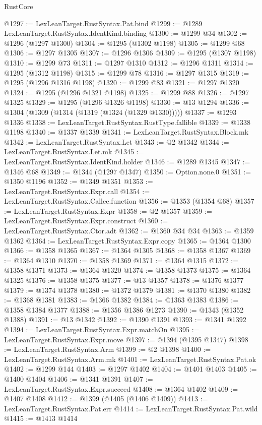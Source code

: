 \begin{lexlean}{RustCore}
\begin{coremodule}
@1297 := LexLeanTarget.RustSyntax.Pat.bind
@1299 := @1289 LexLeanTarget.RustSyntax.IdentKind.binding
@1300 := @1299 @34
@1302 := @1296 (@1297 @1300)
@1304 := @1295 (@1302 @1198)
@1305 := @1299 @68
@1306 := @1297 @1305
@1307 := @1296 @1306
@1309 := @1295 (@1307 @1198)
@1310 := @1299 @73
@1311 := @1297 @1310
@1312 := @1296 @1311
@1314 := @1295 (@1312 @1198)
@1315 := @1299 @78
@1316 := @1297 @1315
@1319 := @1295 (@1296 @1316 @1198)
@1320 := @1299 @83
@1321 := @1297 @1320
@1324 := @1295 (@1296 @1321 @1198)
@1325 := @1299 @88
@1326 := @1297 @1325
@1329 := @1295 (@1296 @1326 @1198)
@1330 := @13 @1294
@1336 := @1304 (@1309 (@1314 (@1319 (@1324 (@1329 @1330)))))
@1337 := @1293 @1336
@1338 := LexLeanTarget.RustSyntax.RustType.fallible
@1339 := @1338 @1198
@1340 := @1337 @1339
@1341 := LexLeanTarget.RustSyntax.Block.mk
@1342 := LexLeanTarget.RustSyntax.Let
@1343 := @2 @1342
@1344 := LexLeanTarget.RustSyntax.Let.mk
@1345 := LexLeanTarget.RustSyntax.IdentKind.holder
@1346 := @1289 @1345
@1347 := @1346 @68
@1349 := @1344 (@1297 @1347)
@1350 := Option.none.{0}
@1351 := @1350 @1196
@1352 := @1349 @1351
@1353 := LexLeanTarget.RustSyntax.Expr.call
@1354 := LexLeanTarget.RustSyntax.Callee.function
@1356 := @1353 (@1354 @68)
@1357 := LexLeanTarget.RustSyntax.Expr
@1358 := @2 @1357
@1359 := LexLeanTarget.RustSyntax.Expr.construct
@1360 := LexLeanTarget.RustSyntax.Ctor.adt
@1362 := @1360 @34 @34
@1363 := @1359 @1362
@1364 := LexLeanTarget.RustSyntax.Expr.copy
@1365 := @1364 @1300
@1366 := @1358 @1365
@1367 := @1364 @1305
@1368 := @1358 @1367
@1369 := @1364 @1310
@1370 := @1358 @1369
@1371 := @1364 @1315
@1372 := @1358 @1371
@1373 := @1364 @1320
@1374 := @1358 @1373
@1375 := @1364 @1325
@1376 := @1358 @1375
@1377 := @13 @1357
@1378 := @1376 @1377
@1379 := @1374 @1378
@1380 := @1372 @1379
@1381 := @1370 @1380
@1382 := @1368 @1381
@1383 := @1366 @1382
@1384 := @1363 @1383
@1386 := @1358 @1384 @1377
@1388 := @1356 @1386 @1273
@1390 := @1343 (@1352 @1388)
@1391 := @13 @1342
@1392 := @1390 @1391
@1393 := @1341 @1392
@1394 := LexLeanTarget.RustSyntax.Expr.matchOn
@1395 := LexLeanTarget.RustSyntax.Expr.move
@1397 := @1394 (@1395 @1347)
@1398 := LexLeanTarget.RustSyntax.Arm
@1399 := @2 @1398
@1400 := LexLeanTarget.RustSyntax.Arm.mk
@1401 := LexLeanTarget.RustSyntax.Pat.ok
@1402 := @1299 @144
@1403 := @1297 @1402
@1404 := @1401 @1403
@1405 := @1400 @1404
@1406 := @1341 @1391
@1407 := LexLeanTarget.RustSyntax.Expr.succeed
@1408 := @1364 @1402
@1409 := @1407 @1408
@1412 := @1399 (@1405 (@1406 @1409))
@1413 := LexLeanTarget.RustSyntax.Pat.err
@1414 := LexLeanTarget.RustSyntax.Pat.wild
@1415 := @1413 @1414

\end{coremodule}
\end{lexlean}
